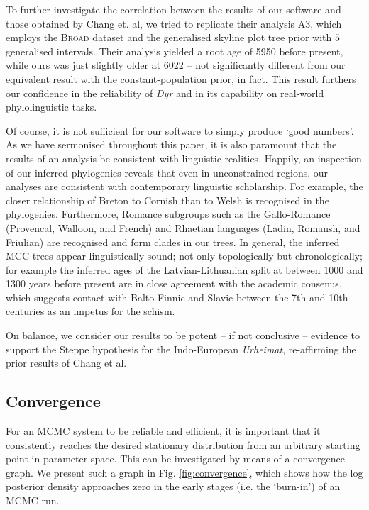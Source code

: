 \documentclass[10pt,journal,compsoc]{IEEEtran}
\begin{document}
To further investigate the correlation between the results of our software and those obtained by Chang et. al, we tried to replicate their analysis A3, which employs the \textsc{Broad} dataset and the generalised skyline plot tree prior with $5$ generalised intervals. Their analysis yielded a root age of 5950 before present, while ours was just slightly older at 6022 -- not significantly different from our equivalent result with the constant-population prior, in fact. This result furthers our confidence in the reliability of \textit{Dyr} and in its capability on real-world phylolinguistic tasks.

Of course, it is not sufficient for our software to simply produce `good numbers'. As we have sermonised throughout this paper, it is also paramount that the results of an analysis be consistent with linguistic realities. Happily, an inspection of our inferred phylogenies reveals that even in unconstrained regions, our analyses are consistent with contemporary linguistic scholarship. For example, the closer relationship of Breton to Cornish than to Welsh is recognised in the phylogenies. Furthermore, Romance subgroups such as the Gallo-Romance (Provencal, Walloon, and French) and Rhaetian languages (Ladin, Romansh, and Friulian) are recognised and form clades in our trees. In general, the inferred MCC trees appear linguistically sound; not only topologically but chronologically; for example the inferred ages of the Latvian-Lithuanian split at between 1000 and 1300 years before present are in close agreement with the academic consenus, which suggests contact with Balto-Finnic and Slavic between the 7th and 10th centuries as an impetus for the schism.\cite{baltic2018}

On balance, we consider our results to be potent -- if not conclusive -- evidence to support the Steppe hypothesis for the Indo-European \textit{Urheimat}, re-affirming the prior results of Chang et al.

\subsection{Convergence}

For an MCMC system to be reliable and efficient, it is important that it consistently reaches the desired stationary distribution from an arbitrary starting point in parameter space. This can be investigated by means of a convergence graph. We present such a graph in Fig. \ref{fig:convergence}, which shows how the log posterior density approaches zero in the early stages (i.e. the `burn-in') of an MCMC run.
\end{document}
